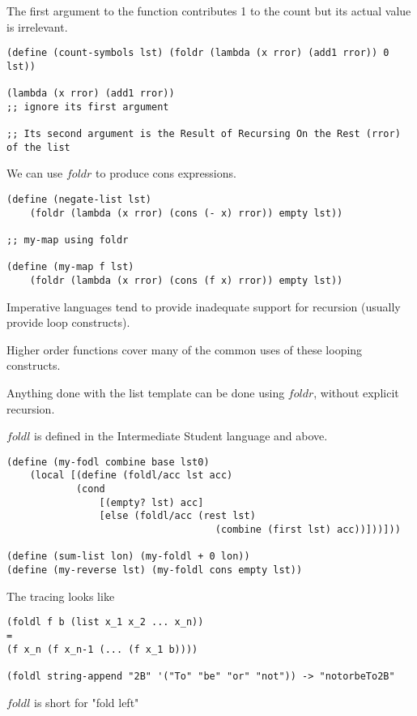 \documentclass{article}
\begin{document}
The first argument to the function contributes 1 to the count but its actual value is irrelevant. 

\begin{lstlisting}
(define (count-symbols lst) (foldr (lambda (x rror) (add1 rror)) 0 lst))

(lambda (x rror) (add1 rror))
;; ignore its first argument

;; Its second argument is the Result of Recursing On the Rest (rror) of the list
\end{lstlisting}

We can use $foldr$ to produce cons expressions. 

\begin{lstlisting}
(define (negate-list lst)
    (foldr (lambda (x rror) (cons (- x) rror)) empty lst))

;; my-map using foldr

(define (my-map f lst)
    (foldr (lambda (x rror) (cons (f x) rror)) empty lst))
\end{lstlisting}

Imperative languages tend to provide inadequate support for recursion (usually provide loop constructs). 

Higher order functions cover many of the common uses of these looping constructs. 

Anything done with the list template can be done using $foldr$, without explicit recursion. 


$foldl$ is defined in the Intermediate Student language and above. 

\begin{lstlisting}
(define (my-fodl combine base lst0)
    (local [(define (foldl/acc lst acc)
            (cond
                [(empty? lst) acc]
                [else (foldl/acc (rest lst)
                                    (combine (first lst) acc))]))]))

(define (sum-list lon) (my-foldl + 0 lon))
(define (my-reverse lst) (my-foldl cons empty lst))
\end{lstlisting}

The tracing looks like

\begin{lstlisting}
(foldl f b (list x_1 x_2 ... x_n))
=
(f x_n (f x_n-1 (... (f x_1 b))))

(foldl string-append "2B" '("To" "be" "or" "not")) -> "notorbeTo2B"
\end{lstlisting}

$foldl$ is short for "fold left"
\end{document}
